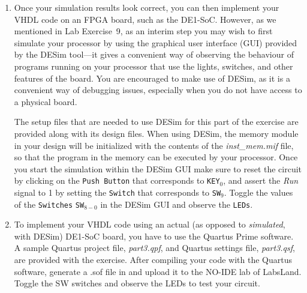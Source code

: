 \documentclass[epsfig,10pt,fullpage]{article} \addtolength{\textwidth}{1.5in}
\begin{document}
\begin{enumerate}
\lstset{language=ASM,numbers=none,escapechar=|}
\begin{figure}[H]
\begin{center}
\begin{minipage}[h]{12.5 cm}
\begin{lstlisting}[name=proc]
|\label{line:module}|.define LED_ADDRESS 0x10
.define SW_ADDRESS 0x30

// Read SW switches and display on LEDs
			mvt	r3, #LED_ADDRESS	// point to LED port
			mvt	r4, #SW_ADDRESS	// point to SW port
MAIN:		ld		r0, [r4]				// read SW values
			st		r0, [r3]				// light up LEDs
			mv 	pc, #MAIN
\end{lstlisting}
\end{minipage}
\caption{Assembly-language program that uses {\it ld} and {\it st} instructions.}
\label{fig:assembly}
\end{center}
\end{figure}

An example simulation result for a correctly-designed circuit 
is given in Figure~\ref{fig:part3}. It shows the execution of the first four instructions
in Figure~\ref{fig:assembly}.

\item Once your simulation results look correct, you can then implement your VHDL
code on an FPGA board, such as the DE1-SoC. However, as we mentioned in Lab Exercise~9, as
an interim step you may wish to first simulate your processor by using the graphical user
interface (GUI) provided by the DESim tool---it gives a convenient way of observing the behaviour 
of programs running on your processor that use the lights, switches, and other features of 
the board. You are encouraged to make use of DESim, as it
is a convenient way of debugging issues, especially when you do not have access to a 
physical board.

The setup files that are needed to use DESim for this part of the exercise are provided along
with its design files.  When using DESim, the memory module in your design will be initialized with
the contents of the {\it inst\_mem.mif} file, so that the program in the memory 
can be executed by your processor. Once you start the simulation within the DESim GUI make sure to 
reset the circuit by clicking on the \texttt{Push Button} that corresponds to
\texttt{KEY}$_0$, and assert the {\it Run} signal to 1 by setting the \texttt{Switch}
that corresponds to \texttt{SW}$_9$. Toggle the values of the \texttt{Switches}
\texttt{SW}$_{8-0}$ in the DESim GUI and observe the \texttt{LEDs}. 

\item
To implement your VHDL code using an actual (as opposed to {\it simulated}, with DESim) 
DE1-SoC board, you have to use the Quartus Prime software.
A sample Quartus project file, {\it part3.qpf}, and Quartus
settings file, {\it part3.qsf}, are provided with the exercise. After compiling your code 
with the Quartus software, generate a .sof file in and upload it to the NO-IDE lab of LabsLand. Toggle the SW switches and observe the LEDs to test your circuit.
\end{enumerate}
\end{document}
